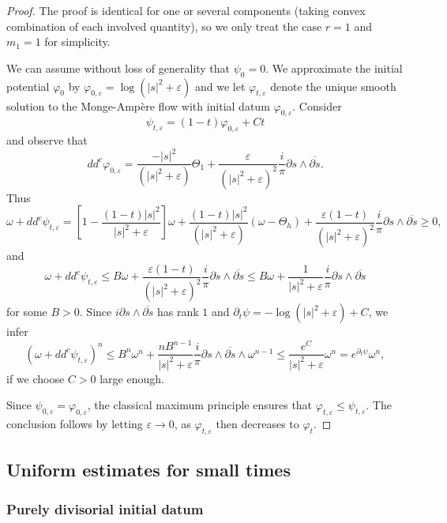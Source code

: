 \documentclass[10pt,a4paper]{amsart}
\numberwithin{equation}{section}
\newcommand{\f}{\varphi}
\newcommand{\p}{\psi}
\newcommand \e {\varepsilon}
\begin{document}
\begin{proof}
The proof is identical for one or several components (taking convex combination of each involved quantity), 
so we only treat the case $r=1$ and $m_1=1$ for simplicity.


We can assume without loss of generality that $\p_0=0$.
We approximate the initial potential $\varphi_0$ by $\varphi_{0,\varepsilon}= \log (|s|^2+\varepsilon)$ and we let $\varphi_{t,\varepsilon}$ denote the unique smooth solution to the Monge-Amp\`ere flow with initial datum 	$\varphi_{0,\varepsilon}$. 
Consider
$$
\p_{t,\e}=(1-t) \varphi_{0,\varepsilon} +C t
$$
and observe that 
$$
dd^c \varphi_{0,\varepsilon} 
 = \frac{-|s|^2}{(|s|^2+\varepsilon)} \Theta_1
 + \frac{\varepsilon }{(|s|^2+\varepsilon)^2}\frac{ i}{\pi} \partial s \wedge \overline{\partial s}. 
$$
Thus
$$
\omega+dd^c \p_{t,\e}=\left[ 1-\frac{(1-t) |s|^2}{|s|^2+\varepsilon} \right] \omega
+\frac{(1-t)|s|^2}{(|s|^2+\varepsilon)} (\omega-\Theta_h)
+ \frac{\varepsilon (1-t)}{(|s|^2+\varepsilon)^2} \frac{ i}{\pi}  \partial s \wedge \overline{\partial s} \geq 0,
$$
and 
$$
\omega+dd^c \p_{t,\e} \leq B \omega+ \frac{\varepsilon (1-t)}{(|s|^2+\varepsilon)^2} \frac{ i}{\pi}  \partial s \wedge \overline{\partial s}
\leq B \omega+ \frac{1}{|s|^2+\varepsilon} \frac{ i}{\pi}  \partial s \wedge \overline{\partial s}
$$
for some $B>0$.
Since $i \partial s \wedge \overline{\partial s}$ has rank $1$ and
 $\partial_t \p=-\log (|s|^2+\varepsilon) +C$, we infer
$$
(\omega+dd^c \p_{t,\e})^n \leq B^n \omega^n+ \frac{nB^{n-1}}{|s|^2+\varepsilon} \frac{ i}{\pi}  \partial s \wedge \overline{\partial s} \wedge \omega^{n-1}
\leq  \frac{e^C}{|s|^2+\varepsilon}  \omega^{n}=e^{\partial_t \p} \omega^n,
$$
if we choose $C>0$ large enough.

Since $\p_{0,\e}=\f_{0,\e}$, the classical maximum principle ensures that $\f_{t,\e} \leq \p_{t,\e}$.
The conclusion follows by letting $\e \rightarrow 0$, as $\f_{t,\e}$ then decreases  to $\f_t$.
\end{proof}


  

 





\subsection{Uniform estimates for small times}

\subsubsection{Purely divisorial initial datum}
\end{document}
